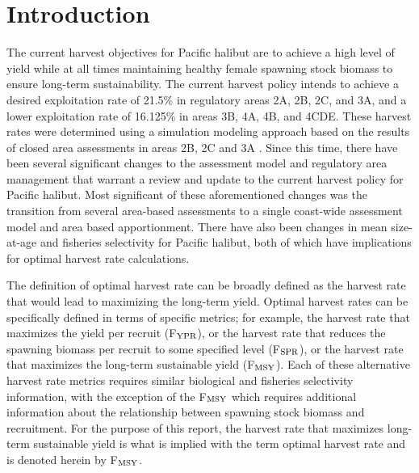 % 








\section*{Introduction} %
\label{sec:introduction}
The current harvest objectives for Pacific halibut are to achieve a high level of yield while at all times maintaining healthy female spawning stock biomass to ensure long-term sustainability. The current harvest policy intends to achieve a desired exploitation rate of 21.5\% in regulatory areas 2A, 2B, 2C, and 3A, and a lower exploitation rate of 16.125\% in areas 3B, 4A, 4B, and 4CDE.  These harvest rates were determined using a simulation modeling approach based on the results of closed area assessments in areas 2B, 2C and 3A \citep{clark2006assessment}.  Since this time, there have been several significant changes to the assessment model and regulatory area management that warrant a review and update to the current harvest policy for Pacific halibut.  Most significant of these aforementioned changes was the transition from several area-based assessments to a single coast-wide assessment model and area based apportionment.
There have also been changes in mean size-at-age and fisheries selectivity for Pacific halibut, both of which have implications for optimal harvest rate calculations.

The definition of optimal harvest rate can be broadly defined as the harvest rate that would lead to maximizing the long-term yield.  Optimal harvest rates can be specifically defined in terms of specific metrics; for example, the harvest rate that maximizes the yield per recruit (F$_{\rm{YPR}}$), or the harvest rate that reduces the spawning biomass per recruit to some specified level (F$_{\rm{SPR}}$), or the harvest rate that maximizes the long-term sustainable yield (F$_{\rm{MSY}}$).  Each of these alternative harvest rate metrics requires similar biological and fisheries selectivity information, with the exception of the F$_{\rm{MSY}}$ which requires additional information about the relationship between spawning stock biomass and recruitment. For the purpose of this report, the harvest rate that maximizes long-term sustainable yield is what is implied with the term optimal harvest rate and is denoted herein by F$_{\rm{MSY}}$.


